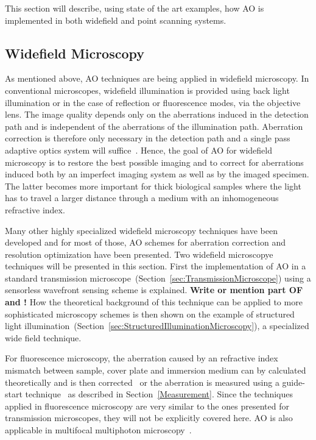 This section will describe, using state of the art examples, how AO is implemented in both widefield and point scanning systems.  


\subsection{Widefield Microscopy}
\label{sec:WidefieldMicroscopy}

As mentioned above, AO techniques are being applied in widefield microscopy. In conventional microscopes, widefield illumination is provided using back light illumination or in the case of reflection or fluorescence modes, via the objective lens. The image quality depends only on the aberrations induced in the detection path and is independent of the aberrations of the illumination path. Aberration correction is therefore only necessary in the detection path and a single pass adaptive optics system will suffice~\cite{book_aberrations}. Hence, the goal of AO for widefield microscopy is to restore the best possible imaging and to correct for aberrations induced both by an imperfect imaging system as well as by the imaged specimen. The latter becomes more important for thick biological samples where the light has to travel a larger distance through a medium with an inhomogeneous refractive index. 

Many other highly specialized widefield microscopy techniques have been developed and for most of those, AO schemes for aberration correction and resolution optimization have been presented. Two widefield microscopye techniques will be presented in this section. First the implementation of AO in a standard transmission microscope~(Section~\ref{sec:TransmissionMicroscope}) using a sensorless wavefront sensing scheme is explained. 
\textbf{Write or mention part OF \cite{wide_directSensing_microscope} and 
\cite{wide_fluorescence_guide_star}!}
How the theoretical background of this technique can be applied to more sophisticated microscopy schemes is then shown on the example of structured light illumination~(Section~\ref{sec:StructuredIlluminationMicroscopy}), a specialized wide field technique. 

For fluorescence microscopy, the aberration caused by an refractive index mismatch between sample, cover plate and immersion medium can by calculated theoretically and is then corrected~\cite{wide_AOM_FM_spehrical_correction} or the aberration is measured using a guide-start technique~\cite{wide_fluorescence_guide_star} as described in Section~\ref{Measurement}. Since the techniques applied in fluorescence microscopy are very similar to the ones presented for transmission microscopes, they will not be explicitly covered here. AO is also applicable in multifocal multiphoton microscopy~\cite{wide_MPFM,wide_MMM_AO}.

